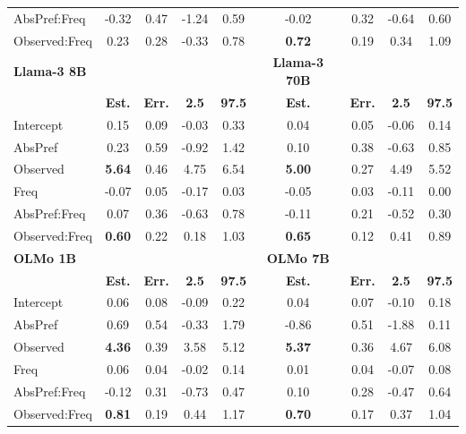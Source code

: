 \documentclass[
  12pt,
  letterpaper,
]{scrreport}
\begin{document}
\begin{table}
{\begin{tabular}{l|cccc|cccc}
         AbsPref:Freq & -0.32 & 0.47 & -1.24 & 0.59 & -0.02 & 0.32 & -0.64 & 0.60 \\
         Observed:Freq & 0.23 & 0.28 & -0.33 & 0.78 & \textbf{0.72} & 0.19 & 0.34 & 1.09  \\
         \hline
         \textbf{Llama-3 8B} & & & & & \textbf{Llama-3 70B}\\
        \hline
         & \textbf{Est.} & \textbf{Err.} & \textbf{2.5} & \textbf{97.5} & \textbf{Est.} & \textbf{Err.} & \textbf{2.5} & \textbf{97.5} \\
         \hline
         Intercept & 0.15 & 0.09 & -0.03 & 0.33 & 0.04 & 0.05 & -0.06 & 0.14 \\
         AbsPref & 0.23 & 0.59 & -0.92 & 1.42 & 0.10 & 0.38 & -0.63 & 0.85  \\
         Observed & \textbf{5.64} & 0.46 & 4.75 & 6.54 & \textbf{5.00} & 0.27 & 4.49 & 5.52 \\
         Freq & -0.07 & 0.05 & -0.17 & 0.03 & -0.05 & 0.03 & -0.11 & 0.00  \\
         AbsPref:Freq & 0.07 & 0.36 & -0.63 & 0.78 & -0.11 & 0.21 & -0.52 & 0.30 \\
         Observed:Freq & \textbf{0.60} & 0.22 & 0.18 & 1.03 & \textbf{0.65} & 0.12 & 0.41 & 0.89 \\
         \hline
          \textbf{OLMo 1B} & & & & & \textbf{OLMo 7B}\\
        \hline
         & \textbf{Est.} & \textbf{Err.} & \textbf{2.5} & \textbf{97.5} & \textbf{Est.} & \textbf{Err.} & \textbf{2.5} & \textbf{97.5} \\
         \hline
         Intercept & 0.06 & 0.08 & -0.09 & 0.22 & 0.04 & 0.07 & -0.10 & 0.18 \\
         AbsPref & 0.69 & 0.54 & -0.33 & 1.79 & -0.86 & 0.51 & -1.88 & 0.11\\
         Observed & \textbf{4.36} & 0.39 & 3.58 & 5.12 & \textbf{5.37} & 0.36 & 4.67 & 6.08 \\
         Freq & 0.06 & 0.04 & -0.02 & 0.14 & 0.01 & 0.04 & -0.07 & 0.08 \\
         AbsPref:Freq & -0.12 & 0.31 & -0.73 & 0.47 & 0.10 & 0.28 & -0.47 & 0.64 \\
         Observed:Freq & \textbf{0.81} & 0.19 & 0.44 & 1.17 & \textbf{0.70} & 0.17 & 0.37 & 1.04  \\
         \hline
    \end{tabular}

}

\end{table}%
\end{document}
